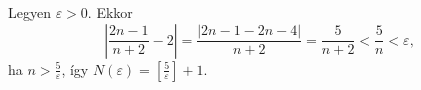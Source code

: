 \documentclass[11pt]{scrartcl}
\begin{document}
Legyen $\varepsilon > 0$. Ekkor
\[
	\left| \frac{2n - 1}{n + 2} - 2 \right|
	= \frac{|2n - 1 - 2n - 4|}{n + 2}
	= \frac{5}{n + 2}
	< \frac{5}{n}
	< \varepsilon,
\]
ha \(n > \frac{5}{\varepsilon}\), így
\(
N(\varepsilon) = \left[ \frac{5}{\varepsilon} \right] + 1
\).
\end{document}
